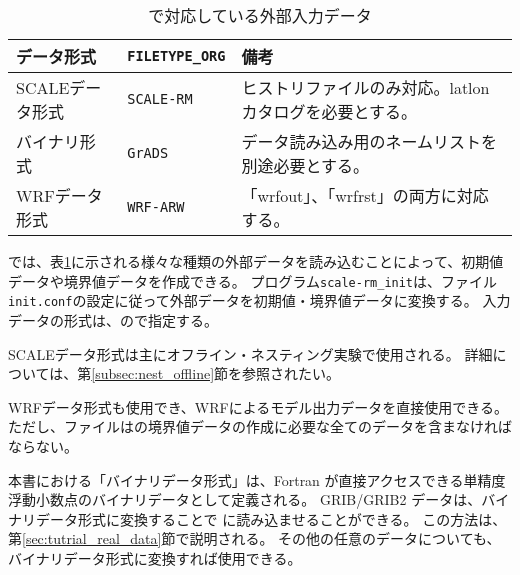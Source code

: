 \section{\SecInputDataSetting} \label{sec:adv_datainput}

\begin{table}[htb]
\begin{center}
\caption{\scalelib で対応している外部入力データ}
\begin{tabularx}{150mm}{|l|l|X|} \hline
 \rowcolor[gray]{0.9} データ形式      & \verb|FILETYPE_ORG|  & 備考 \\ \hline
 SCALEデータ形式   & \verb|SCALE-RM|     &  ヒストリファイルのみ対応。latlonカタログを必要とする。 \\ \hline
 バイナリ形式 & \verb|GrADS|        & データ読み込み用のネームリストを別途必要とする。       \\ \hline
 WRFデータ形式     & \verb|WRF-ARW|      & 「wrfout」、「wrfrst」の両方に対応する。          \\ \hline
\end{tabularx}
\label{tab:inputdata_format}
\end{center}
\end{table}

\scalerm では、表\ref{tab:inputdata_format}に示される様々な種類の外部データを読み込むことによって、初期値データや境界値データを作成できる。
プログラム\verb|scale-rm_init|は、ファイル\verb|init.conf|の設定に従って外部データを初期値・境界値データに変換する。
入力データの形式は、ので指定する。

SCALEデータ形式は主にオフライン・ネスティング実験で使用される。
詳細については、第\ref{subsec:nest_offline}節を参照されたい。

WRFデータ形式も使用でき、WRFによるモデル出力データを直接使用できる。
ただし、ファイルは{\scalerm}の境界値データの作成に必要な全てのデータを含まなければならない。

本書における「バイナリデータ形式」は、Fortran が直接アクセスできる単精度浮動小数点のバイナリデータとして定義される。
GRIB/GRIB2 データは、バイナリデータ形式に変換することで {\scalerm} に読み込ませることができる。
この方法は、第\ref{sec:tutrial_real_data}節で説明される。
その他の任意のデータについても、バイナリデータ形式に変換すれば使用できる。

